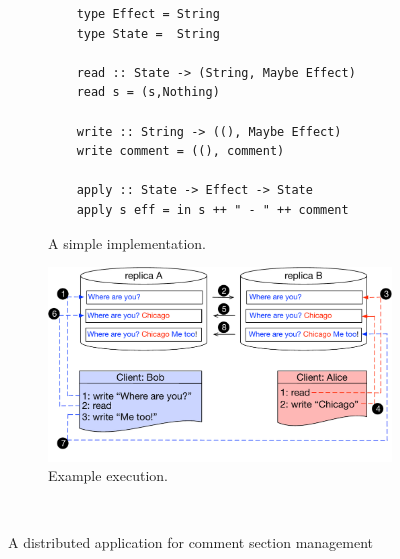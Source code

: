 \begin{figure}[t]
        \centering
	\begin{subfigure}[b]{0.48\textwidth}
	\begin{lstlisting}
	type Effect = String 
	type State =  String 

	read :: State -> (String, Maybe Effect)
	read s = (s,Nothing)

	write :: String -> ((), Maybe Effect)
	write comment = ((), comment)

	apply :: State -> Effect -> State 
	apply s eff = in s ++ " - " ++ comment
	\end{lstlisting}
	\caption{A simple implementation.}
	\label{subfig:comment_code}
	\end{subfigure}
	\hfill
	\begin{subfigure}[b]{0.49\textwidth}
	\includegraphics[scale=0.36]{Figures/comment_application.pdf}
	\caption{Example execution.}
	\label{subfig:comment_example}
	\end{subfigure} 
\\ \hrulefill
\caption{A distributed application for comment section
management}
\label{fig:comment_app}
\end{figure}



